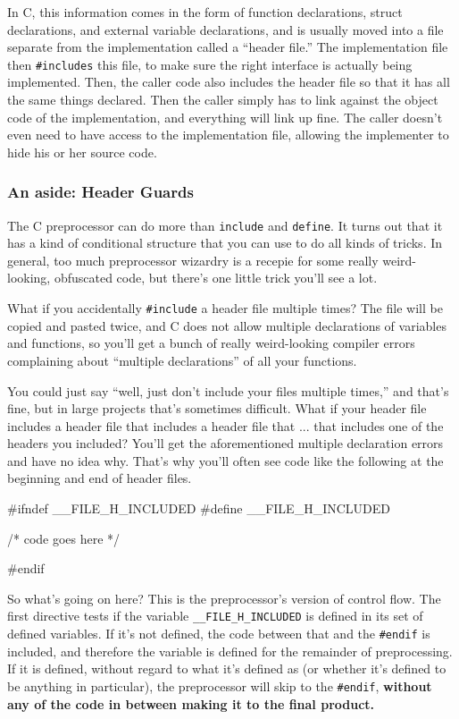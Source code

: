 \documentclass[ebook,11pt,oneside,openany]{memoir}
\newcommand{\cf}[1]{\texttt{#1}}
\begin{document}
In C, this information comes in the form of function declarations, struct declarations, and external variable declarations, and is usually moved into a file separate from the implementation called a ``header file.'' The implementation file then \cf{\#includes} this file, to make sure the right interface is actually being implemented. Then, the caller code also includes the header file so that it has all the same things declared. Then the caller simply has to link against the object code of the implementation, and everything will link up fine. The caller doesn't even need to have access to the implementation file, allowing the implementer to hide his or her source code.

\subsubsection{An aside: Header Guards}

The C preprocessor can do more than \cf{include} and \cf{define}. It turns out that it has a kind of conditional structure that you can use to do all kinds of tricks. In general, too much preprocessor wizardry is a recepie for some really weird-looking, obfuscated code, but there's one little trick you'll see a lot. 

What if you accidentally \cf{\#include} a header file multiple times? The file will be copied and pasted twice, and C does not allow multiple declarations of variables and functions, so you'll get a bunch of really weird-looking compiler errors complaining about ``multiple declarations'' of all your functions.

You could just say ``well, just don't include your files multiple times,'' and that's fine, but in large projects that's sometimes difficult. What if your header file includes a header file that includes a header file that ... that includes one of the headers you included? You'll get the aforementioned multiple declaration errors and have no idea why. That's why you'll often see code like the following at the beginning and end of header files.

\begin{code}[language=C]
#ifndef __FILE_H_INCLUDED
#define __FILE_H_INCLUDED

/*
  code goes here
*/

#endif
\end{code}

\noindent
So what's going on here? This is the preprocessor's version of control flow. The first directive tests if the variable \cf{\_\_FILE\_H\_INCLUDED} is defined in its set of defined variables. If it's not defined, the code between that and the  \cf{\#endif} is included, and therefore the variable is defined for the remainder of preprocessing. If it is defined, without regard to what it's defined as (or whether it's defined to be anything in particular), the preprocessor will skip to the \cf{\#endif}, \textbf{without any of the code in between making it to the final product.} 
\end{document}
